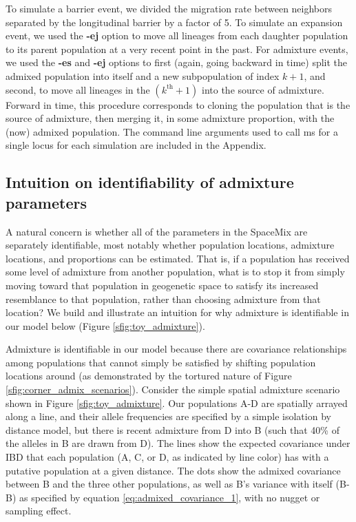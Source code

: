 \documentclass[12pt]{article}
\begin{document}
To simulate a barrier event, we divided the migration rate between neighbors separated by the longitudinal barrier by a factor of 5.  To simulate an expansion event, we used the \textbf{-ej} option to move all lineages from each daughter population to its parent population at a very recent point in the past.  For admixture events, we used the \textbf{-es} and \textbf{-ej} options to first (again, going backward in time) split the admixed population into itself and a new subpopulation of index $k + 1$, and second, to move all lineages in the $(k^{\text{th}} + 1)$ into the source of admixture.  Forward in time, this procedure corresponds to cloning the population that is the source of admixture, then merging it, in some admixture proportion, with the (now) admixed population.  The command line arguments used to call ms for a single locus for each simulation are included in the Appendix.

\subsection*{Intuition on identifiability of admixture parameters}
A natural concern is whether all of the parameters in the SpaceMix are separately identifiable, most notably whether population locations, admixture locations, and proportions can be estimated. That is, if a population has received some level of admixture from another population, what is to stop it from simply moving toward that population in geogenetic space to satisfy its increased resemblance to that population, rather than choosing admixture from that location?  We build and illustrate an intuition for why admixture is identifiable in our model below (Figure  \ref{sfig:toy_admixture}).

Admixture is identifiable in our model because there are covariance relationships among populations that cannot simply be satisfied by shifting population locations around (as demonstrated by the tortured nature of Figure \ref{sfig:corner_admix_scenarios}). Consider the simple spatial admixture scenario shown in Figure \ref{sfig:toy_admixture}. Our populations A-D are spatially arrayed  along a line, and their allele frequencies are specified by a simple isolation by distance model, but there is recent admixture from D into B (such that 40\% of the alleles in B are drawn from D).  The lines show the expected covariance under IBD that each population (A, C, or D, as indicated by line color) has with a putative population at a given distance.  The dots show the admixed covariance between B and the three other populations, as well as B's variance with itself (B-B) as specified by equation \eqref{eq:admixed_covariance_1}, with no nugget or sampling effect.
\end{document}
